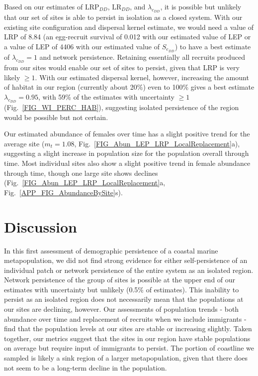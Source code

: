 \documentclass[12pt, oneside]{article}   	%
\begin{document}
Based on our estimates of $\text{LRP}_{DD}$, $\text{LR}_{DD}$, and $\lambda_{c_{DD}}$, it is possible but unlikely that our set of sites is able to persist in isolation as a closed system. With our existing site configuration and dispersal kernel estimate, we would need a value of LRP of 8.84 (an egg-recruit survival of 0.012 with our estimated value of LEP or a value of LEP of 4406 with our estimated value of $S_{e_{DD}}$) to have a best estimate of $\lambda_{c_{DD}} = 1$ and network persistence. Retaining essentially all recruits produced from our sites would enable our set of sites to persist, given that LRP is very likely $\geq 1$. With our estimated dispersal kernel, however, increasing the amount of habitat in our region (currently about 20\%) even to 100\% gives a best estimate $\lambda_{c_{DD}} = 0.95$, with 59\% of the estimates with uncertainty $\geq 1$ (Fig.\ \ref{FIG_WI_PERC_HAB}), suggesting isolated persistence of the region would be possible but not certain.


Our estimated abundance of females over time has a slight positive trend for the average site ($m_t = 1.08$, Fig.\ \ref{FIG_Abun_LEP_LRP_LocalReplacement}a), suggesting a slight increase in population size for the population overall through time. Most individual sites also show a slight positive trend in female abundance through time, though one large site shows declines (Fig.\ \ref{FIG_Abun_LEP_LRP_LocalReplacement}a, Fig.\ \ref{APP_FIG_AbundanceBySite}s). %

\section*{Discussion}
In this first assessment of demographic persistence of a coastal marine metapopulation, we did not find strong evidence for either self-persistence of an individual patch or network persistence of the entire system as an isolated region. Network persistence of the group of sites is possible at the upper end of our estimates with uncertainty but unlikely (0.5\% of estimates). This inability to persist as an isolated region does not necessarily mean that the populations at our sites are declining, however. Our assessments of population trends - both abundance over time and replacement of recruits when we include immigrants - find that the population levels at our sites are stable or increasing slightly. Taken together, our metrics suggest that the sites in our region have stable populations on average but require input of immigrants to persist. The portion of coastline we sampled is likely a sink region of a larger metapopulation, given that there does not seem to be a long-term decline in the population. %
\end{document}
